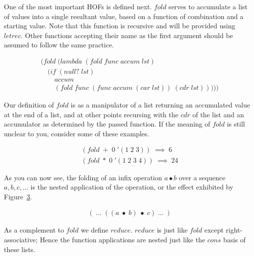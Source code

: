 One of the most important HOFs is defined next. $fold$ serves to accumulate a list 
of values into a single resultant value, based on a function of combination and a 
starting value. Note that this function is recursive and will be provided using 
$letrec$. Other functions accepting their name as the first argument should be 
assumed to follow the same practice.

\begin{figure}[htp]
\caption{}\label{fig:foldDef}
\begin{align*}
& (fold \; (lambda \; (fold \; func \; accum \; lst)
\\& \quad (if \; (null? \; lst)
\\& \qquad accum
\\& \qquad (fold \; func \; (func \; accum \; (car \; lst)) \; (cdr \; lst)))))
\end{align*}
\end{figure}

Our definition of $fold$ is as a manipulator of a list returning an accumulated 
value at the end of a list, and at other points recursing with the $cdr$ of the 
list and an accumulator as determined by the passed function. If the meaning of 
$fold$ is still unclear to you, consider some of these examples.

\begin{figure}[htp]
\caption{}\label{fig:foldExamples}
\begin{align*}
& (fold \; + \; 0 \; '(1 \; 2 \; 3)) \; \implies \; 6
\\& (fold \; * \; 0 \; '(1 \; 2 \; 3 \; 4)) \; \implies \; 24
\end{align*}
\end{figure}

As you can now see, the folding of an infix operation $a \bullet b$ over a 
sequence $a, b, c, ...$ is the nested application of the operation, or the 
effect exhibited by Figure~\ref{fig:foldVisual}.

\begin{figure}[htp]
\caption{}\label{fig:foldVisual}
\begin{align*}
& ( \; \dots \; ((a \; \bullet \; b) \; \bullet \; c) \; \dots \; )
\end{align*}
\end{figure}

As a complement to $fold$ we define $reduce$. $reduce$ is just like $fold$ except 
right-associative; Hence the function applications are nested just like the $cons$ 
basis of these lists.

